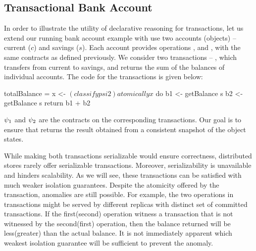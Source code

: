 \subsection{Transactional Bank Account}

In order to illustrate the utility of declarative reasoning for transactions,
let us extend our running bank account example with use two accounts (objects)
-- current ($c$) and savings ($s$). Each account provides operations
,  and , with the same contracts as
defined previously. We consider two transactions -- , which
transfers  from current to savings, and  returns the
sum of the balances of individual accounts. The \name code for the transactions
is given below:
\vspace{-1em}

\noindent \begin{minipage}[t]{0.5\columnwidth}
\end{minipage}
\begin{minipage}[t]{0.5\columnwidth}
\begin{codehaskell}
totalBalance =
  x <- $(classify psi2)
  atomically x $ do
    b1 <- getBalance s
    b2 <- getBalance s
    return b1 + b2
\end{codehaskell}
\end{minipage}

\noindent $\psi_1$ and $\psi_2$ are the contracts on the corresponding
transactions. Our goal is to ensure that  returns the result
obtained from a consistent snapshot of the object states.

While making both transactions serializable would ensure correctness,
distributed stores rarely offer serializable transactions. Moreover,
serializability is unavailable and hinders scalability. As we will see, these
transactions can be satisfied with much weaker isolation guarantees. Despite
the atomicity offered by the transaction, anomalies are still possible. For
example, the two  operations in  transactions
might be served by different replicas with distinct set of committed 
transactions. If the first(second)  operation witness a
 transaction that is not witnessed by the second(first)
 operation, then the balance returned will be less(greater) than
the actual balance. It is not immediately apparent which weakest isolation
guarantee will be sufficient to prevent the anomaly.


